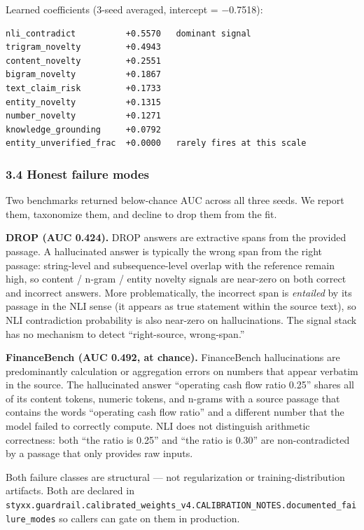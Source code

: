 \documentclass[
  11pt]{article}
\begin{document}
Learned coefficients (3-seed averaged, intercept = −0.7518):

\begin{verbatim}
nli_contradict          +0.5570   dominant signal
trigram_novelty         +0.4943
content_novelty         +0.2551
bigram_novelty          +0.1867
text_claim_risk         +0.1733
entity_novelty          +0.1315
number_novelty          +0.1271
knowledge_grounding     +0.0792
entity_unverified_frac  +0.0000   rarely fires at this scale
\end{verbatim}

\subsubsection{3.4 Honest failure modes}\label{honest-failure-modes}

Two benchmarks returned below-chance AUC across all three seeds. We
report them, taxonomize them, and decline to drop them from the fit.

\textbf{DROP (AUC 0.424).} DROP answers are extractive spans from the
provided passage. A hallucinated answer is typically the wrong span from
the right passage: string-level and subsequence-level overlap with the
reference remain high, so content / n-gram / entity novelty signals are
near-zero on both correct and incorrect answers. More problematically,
the incorrect span is \emph{entailed} by its passage in the NLI sense
(it appears as true statement within the source text), so NLI
contradiction probability is also near-zero on hallucinations. The
signal stack has no mechanism to detect ``right-source, wrong-span.''

\textbf{FinanceBench (AUC 0.492, at chance).} FinanceBench
hallucinations are predominantly calculation or aggregation errors on
numbers that appear verbatim in the source. The hallucinated answer
``operating cash flow ratio 0.25'' shares all of its content tokens,
numeric tokens, and n-grams with a source passage that contains the
words ``operating cash flow ratio'' and a different number that the
model failed to correctly compute. NLI does not distinguish arithmetic
correctness: both ``the ratio is 0.25'' and ``the ratio is 0.30'' are
non-contradicted by a passage that only provides raw inputs.

Both failure classes are structural --- not regularization or
training-distribution artifacts. Both are declared in
\texttt{styxx.guardrail.calibrated\_weights\_v4.CALIBRATION\_NOTES.documented\_failure\_modes}
so callers can gate on them in production.
\end{document}
